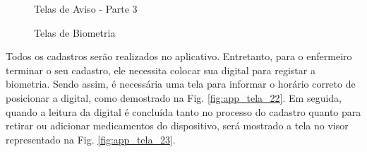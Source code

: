 \begin{apendicesenv}
\begin{figure}[H]
    \centering
    \caption{Telas de Aviso - Parte 3}\label{fig:telas_18_8}
\end{figure}


\begin{figure}[H]
    \centering
    \caption{Telas de Biometria}\label{fig:telas_22_23}
\end{figure}
Todos os cadastros serão realizados no aplicativo. Entretanto, para o enfermeiro terminar o seu cadastro, ele necessita colocar sua digital para registar a biometria. Sendo assim, é necessária uma tela para informar o horário correto de posicionar a digital, como demostrado na Fig. \ref{fig:app_tela_22}. Em seguida, quando a leitura da digital é concluída tanto no processo do cadastro quanto para retirar ou adicionar medicamentos do dispositivo, será mostrado a tela no visor representado na Fig. \ref{fig:app_tela_23}.



\end{apendicesenv}
